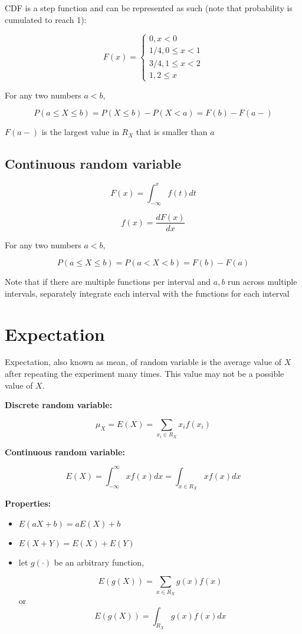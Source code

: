 \documentclass[twocolumn, 8pt]{extarticle}
\begin{document}
CDF is a step function and can be represented as such (note that probability is cumulated to reach 1):

$$
F(x) = \begin{cases}
    0, x < 0\\
    1/4, 0 \leq x < 1\\
    3/4, 1 \leq x < 2\\
    1, 2 \leq x
\end{cases}
$$

For any two numbers $a < b$,

$$
P(a \leq X \leq b) = P(X \leq b) - P(X < a) = F(b) - F(a-)
$$

$F(a-)$ is the largest value in $R_X$ that is smaller than $a$

\subsection*{Continuous random variable}

$$
F(x) = \int_{-\infty}^x f(t) dt
$$

$$
f(x) = \frac{d F(x)}{dx}
$$

For any two numbers $a < b$,

$$
P(a \leq X \leq b) = P(a < X < b) = F(b) - F(a)
$$

Note that if there are multiple functions per interval and $a, b$ run across multiple intervals, separately integrate each interval with the functions for each interval

\section*{Expectation}

Expectation, also known as mean, of random variable is the average value of $X$ after repeating the experiment many times. This value may not be a possible value of $X$.

\textbf{Discrete random variable:}

$$
\mu_X = E(X) = \sum_{x_i \in R_X} x_i f(x_i)
$$

\textbf{Continuous random variable:}

$$
E(X) = \int_{-\infty}^{\infty} x f(x) dx = \int_{x \in R_X} x f(x) dx
$$

\textbf{Properties:}

\begin{itemize}
    \item $E(aX + b) = aE(X) + b$
    \item $E(X + Y) = E(X) + E(Y)$
    \item let $g(\cdot)$ be an arbitrary function, 
    
        $$E(g(X)) = \sum_{x\in R_X} g(x)f(x)$$ or $$E(g(X)) = \int_{R_X} g(x)f(x) dx$$
\end{itemize}
\end{document}
